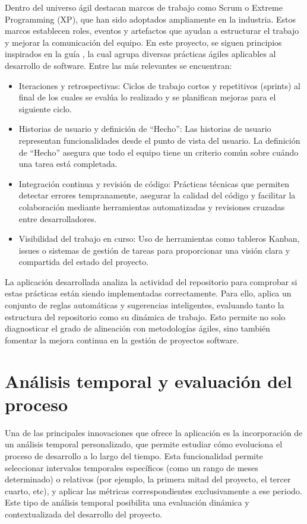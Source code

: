 Dentro del universo ágil destacan marcos de trabajo como Scrum o Extreme Programming (XP), que han sido adoptados ampliamente en la industria. Estos marcos establecen roles, eventos y artefactos que ayudan a estructurar el trabajo y mejorar la comunicación del equipo. En este proyecto, se siguen principios inspirados en la guía \cite{agileSubwayMap}, la cual agrupa diversas prácticas ágiles aplicables al desarrollo de software. Entre las más relevantes se encuentran:

\begin{itemize}
\item Iteraciones y retrospectivas: Ciclos de trabajo cortos y repetitivos (sprints) al final de los cuales se evalúa lo realizado y se planifican mejoras para el siguiente ciclo.
\item Historias de usuario y definición de “Hecho”: Las historias de usuario representan funcionalidades desde el punto de vista del usuario. La definición de “Hecho” asegura que todo el equipo tiene un criterio común sobre cuándo una tarea está completada.
\item Integración continua y revisión de código: Prácticas técnicas que permiten detectar errores tempranamente, asegurar la calidad del código y facilitar la colaboración mediante herramientas automatizadas y revisiones cruzadas entre desarrolladores.
\item Visibilidad del trabajo en curso: Uso de herramientas como tableros Kanban, issues o sistemas de gestión de tareas para proporcionar una visión clara y compartida del estado del proyecto.
\end{itemize}

La aplicación desarrollada analiza la actividad del repositorio para comprobar si estas prácticas están siendo implementadas correctamente. Para ello, aplica un conjunto de reglas automáticas y sugerencias inteligentes, evaluando tanto la estructura del repositorio como su dinámica de trabajo. Esto permite no solo diagnosticar el grado de alineación con metodologías ágiles, sino también fomentar la mejora continua en la gestión de proyectos software.

\section{Análisis temporal y evaluación del proceso}
Una de las principales innovaciones que ofrece la aplicación es la incorporación de un análisis temporal personalizado, que permite estudiar cómo evoluciona el proceso de desarrollo a lo largo del tiempo. Esta funcionalidad permite seleccionar intervalos temporales específicos (como un rango de meses determinado) o relativos (por ejemplo, la primera mitad del proyecto, el tercer cuarto, etc), y aplicar las métricas correspondientes exclusivamente a ese periodo. Este tipo de análisis temporal posibilita una evaluación dinámica y contextualizada del desarrollo del proyecto.

